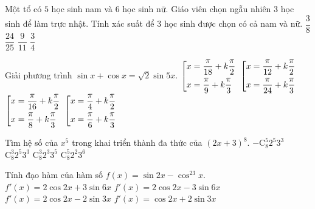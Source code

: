 \begin{ex}%
    Một tổ có $5$ học sinh nam và $6$ học sinh nữ. Giáo viên chọn ngẫu nhiên $3$ học sinh để làm trực nhật. Tính xác suất để $3$ học sinh được chọn có cả nam và nữ.
    \choice
    {$\dfrac{3}{8}$}
    {$\dfrac{24}{25}$}
    {\True $\dfrac{9}{11}$}
    {$ \dfrac{3}{4}$}
\end{ex}
\begin{ex}%
	Giải phương trình $\sin x + \cos x=\sqrt{2}\sin 5x$.
	\choice
	{$\left[\begin{aligned}
			& x=\dfrac{\pi}{18} + k\dfrac{\pi}{2} \\
			& x=\dfrac{\pi}{9} + k\dfrac{\pi}{3}\end{aligned}\right.$}
	{$\left[\begin{aligned}
			& x=\dfrac{\pi}{12} + k\dfrac{\pi}{2} \\
			& x=\dfrac{\pi}{24} + k\dfrac{\pi}{3}\end{aligned}\right.$}
	{\True  $\left[\begin{aligned}
			& x=\dfrac{\pi}{16} + k\dfrac{\pi}{2} \\
			& x=\dfrac{\pi}{8} + k\dfrac{\pi}{3}\end{aligned}\right.$}
	{$\left[\begin{aligned}
			& x=\dfrac{\pi}{4} + k\dfrac{\pi}{2} \\
			& x=\dfrac{\pi}{6} + k\dfrac{\pi}{3}\end{aligned}\right.$}
\end{ex}

\begin{ex}%
	Tìm hệ số của $x^5$ trong khai triển thành đa thức của $(2x + 3)^8$.
	\choice
	{$ - \mathrm{C}_8^5  2^5 3^3$}
	{\True $ \mathrm{C}_8^3  2^5 3^3$}
	{$ \mathrm{C}_8^3 2^3 3^5$}
	{$\mathrm{C}_8^5 2^2 3^6$}
\end{ex}

\begin{ex}%
	Tính đạo hàm của hàm số $f(x)=\sin 2x - {\cos}^23x$.
	\choice
	{\True $f'(x)=2\cos 2x + 3\sin 6x$}
	{$f'(x)=2\cos 2x - 3\sin 6x$}
	{$f'(x)=2\cos 2x - 2\sin 3x$}
	{$f'(x)=\cos 2x + 2\sin 3x$}
\end{ex}

